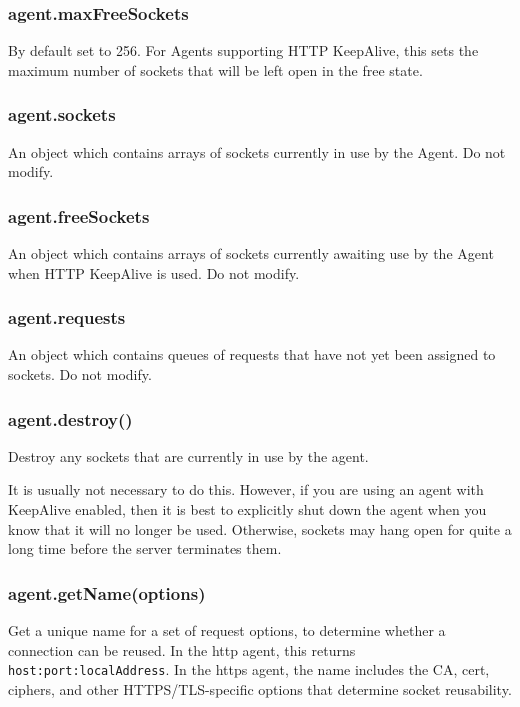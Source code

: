 \subsubsection{agent.maxFreeSockets}

By default set to 256. For Agents supporting HTTP KeepAlive, this sets
the maximum number of sockets that will be left open in the free state.

\subsubsection{agent.sockets}

An object which contains arrays of sockets currently in use by the
Agent. Do not modify.

\subsubsection{agent.freeSockets}

An object which contains arrays of sockets currently awaiting use by the
Agent when HTTP KeepAlive is used. Do not modify.

\subsubsection{agent.requests}

An object which contains queues of requests that have not yet been
assigned to sockets. Do not modify.

\subsubsection{agent.destroy()}

Destroy any sockets that are currently in use by the agent.

It is usually not necessary to do this. However, if you are using an
agent with KeepAlive enabled, then it is best to explicitly shut down
the agent when you know that it will no longer be used. Otherwise,
sockets may hang open for quite a long time before the server terminates
them.

\subsubsection{agent.getName(options)}

Get a unique name for a set of request options, to determine whether a
connection can be reused. In the http agent, this returns
\texttt{host:port:localAddress}. In the https agent, the name includes
the CA, cert, ciphers, and other HTTPS/TLS-specific options that
determine socket reusability.

